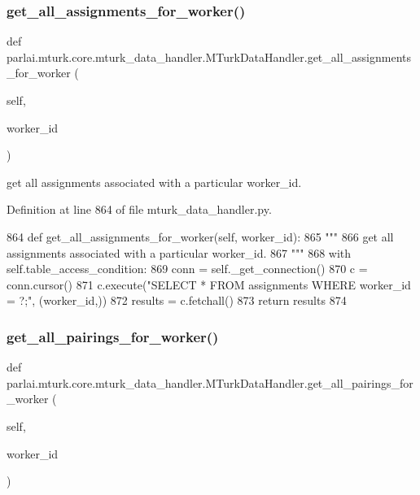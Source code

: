\subsubsection{\texorpdfstring{get\+\_\+all\+\_\+assignments\+\_\+for\+\_\+worker()}{get\_all\_assignments\_for\_worker()}}
{\footnotesize\ttfamily def parlai.\+mturk.\+core.\+mturk\+\_\+data\+\_\+handler.\+M\+Turk\+Data\+Handler.\+get\+\_\+all\+\_\+assignments\+\_\+for\+\_\+worker (\begin{DoxyParamCaption}\item[{}]{self,  }\item[{}]{worker\+\_\+id }\end{DoxyParamCaption})}

\begin{DoxyVerb}get all assignments associated with a particular worker_id.
\end{DoxyVerb}
 

Definition at line 864 of file mturk\+\_\+data\+\_\+handler.\+py.


\begin{DoxyCode}
864     \textcolor{keyword}{def }get\_all\_assignments\_for\_worker(self, worker\_id):
865         \textcolor{stringliteral}{"""}
866 \textcolor{stringliteral}{        get all assignments associated with a particular worker\_id.}
867 \textcolor{stringliteral}{        """}
868         with self.table\_access\_condition:
869             conn = self.\_get\_connection()
870             c = conn.cursor()
871             c.execute(\textcolor{stringliteral}{"SELECT * FROM assignments WHERE worker\_id = ?;"}, (worker\_id,))
872             results = c.fetchall()
873             \textcolor{keywordflow}{return} results
874 
\end{DoxyCode}
\mbox{\label{classparlai_1_1mturk_1_1core_1_1mturk__data__handler_1_1MTurkDataHandler_af115126a912672f030143d16b281c1d3}} 
\subsubsection{\texorpdfstring{get\+\_\+all\+\_\+pairings\+\_\+for\+\_\+worker()}{get\_all\_pairings\_for\_worker()}}
{\footnotesize\ttfamily def parlai.\+mturk.\+core.\+mturk\+\_\+data\+\_\+handler.\+M\+Turk\+Data\+Handler.\+get\+\_\+all\+\_\+pairings\+\_\+for\+\_\+worker (\begin{DoxyParamCaption}\item[{}]{self,  }\item[{}]{worker\+\_\+id }\end{DoxyParamCaption})}

